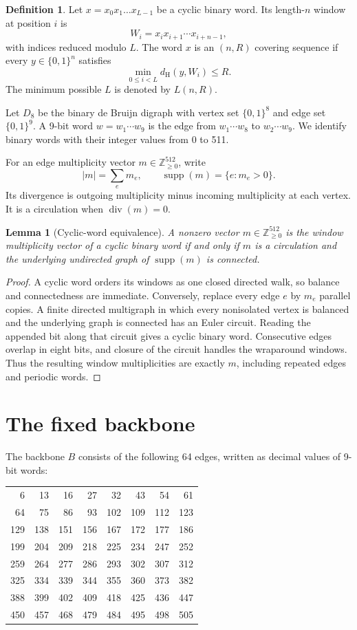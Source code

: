 \documentclass[11pt]{article}
\newtheorem{lemma}[theorem]{Lemma}
\theoremstyle{definition}
\newtheorem{definition}[theorem]{Definition}
\theoremstyle{remark}
\newcommand{\cube}{\{0,1\}}
\newcommand{\dist}{d_{\mathrm H}}
\newcommand{\supp}{\operatorname{supp}}
\newcommand{\divg}{\operatorname{div}}
\begin{document}
\begin{definition}
Let $x=x_0x_1\ldots x_{L-1}$ be a cyclic binary word.  Its length-$n$
window at position $i$ is
\[
  W_i=x_ix_{i+1}\cdots x_{i+n-1},
\]
with indices reduced modulo $L$.  The word $x$ is an $(n,R)$ covering
sequence if every $y\in\cube^n$ satisfies
\[
  \min_{0\leq i<L}\dist(y,W_i)\leq R.
\]
The minimum possible $L$ is denoted by $L(n,R)$.
\end{definition}

Let $D_8$ be the binary de Bruijn digraph with vertex set $\cube^8$ and
edge set $\cube^9$.  A 9-bit word $w=w_1\cdots w_9$ is the edge from
$w_1\cdots w_8$ to $w_2\cdots w_9$.  We identify binary words with their
integer values from 0 to 511.

For an edge multiplicity vector
$m\in\mathbb Z_{\geq 0}^{512}$, write
\[
  |m|=\sum_e m_e,\qquad
  \supp(m)=\{e:m_e>0\}.
\]
Its divergence is outgoing multiplicity minus incoming multiplicity at
each vertex.  It is a circulation when $\divg(m)=0$.

\begin{lemma}[Cyclic-word equivalence]
\label{lem:euler}
A nonzero vector $m\in\mathbb Z_{\geq0}^{512}$ is the window
multiplicity vector of a cyclic binary word if and only if $m$ is a
circulation and the underlying undirected graph of $\supp(m)$ is
connected.
\end{lemma}

\begin{proof}
A cyclic word orders its windows as one closed directed walk, so balance
and connectedness are immediate.  Conversely, replace every edge $e$ by
$m_e$ parallel copies.  A finite directed multigraph in which every
nonisolated vertex is balanced and the underlying graph is connected has
an Euler circuit.  Reading the appended bit along that circuit gives a
cyclic binary word.  Consecutive edges overlap in eight bits, and closure
of the circuit handles the wraparound windows.  Thus the resulting
window multiplicities are exactly $m$, including repeated edges and
periodic words.
\end{proof}

\section{The fixed backbone}

The backbone $B$ consists of the following 64 edges, written as decimal
values of 9-bit words:

\begin{center}
\small
\begin{tabular}{rrrrrrrr}
6&13&16&27&32&43&54&61\\
64&75&86&93&102&109&112&123\\
129&138&151&156&167&172&177&186\\
199&204&209&218&225&234&247&252\\
259&264&277&286&293&302&307&312\\
325&334&339&344&355&360&373&382\\
388&399&402&409&418&425&436&447\\
450&457&468&479&484&495&498&505
\end{tabular}
\end{center}
\end{document}
